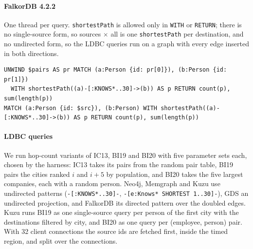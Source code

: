 \paragraph{FalkorDB 4.2.2} One thread per query. \texttt{shortestPath} is allowed only in \texttt{WITH} or
\texttt{RETURN}; there is no single-source form, so sources $\times$ all is one \texttt{shortestPath} per destination,
and no undirected form, so the LDBC queries run on a graph with every edge inserted in both directions.
\begin{lstlisting}
UNWIND $pairs AS pr MATCH (a:Person {id: pr[0]}), (b:Person {id: pr[1]})
  WITH shortestPath((a)-[:KNOWS*..30]->(b)) AS p RETURN count(p), sum(length(p))
MATCH (a:Person {id: $src}), (b:Person) WITH shortestPath((a)-[:KNOWS*..30]->(b)) AS p RETURN count(p), sum(length(p))
\end{lstlisting}

\paragraph{LDBC queries} We run hop-count variants of IC13, BI19 and BI20 with five parameter sets each, chosen by the
harness: IC13 takes its pairs from the random pair table, BI19 pairs the cities ranked $i$ and $i+5$ by population,
and BI20 takes the five largest companies, each with a random person. Neo4j, Memgraph and Kuzu use undirected patterns
(\texttt{-[:KNOWS*..30]-}, \texttt{-[e:Knows* SHORTEST 1..30]-}), GDS an undirected projection, and FalkorDB its
directed pattern over the doubled edges. Kuzu runs BI19 as one single-source query per person of the first city with
the destinations filtered by city, and BI20 as one query per (employee, person) pair. With 32 client connections the
source ids are fetched first, inside the timed region, and split over the connections.

